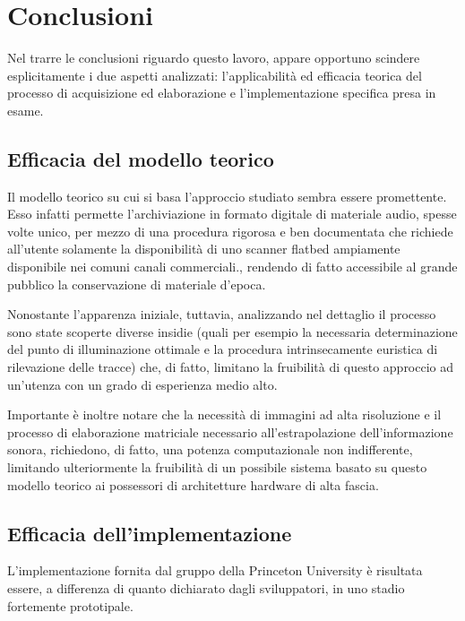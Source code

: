 \section{Conclusioni}
Nel trarre le conclusioni riguardo questo lavoro, appare opportuno scindere esplicitamente i due aspetti analizzati: l'applicabilit\`a ed efficacia teorica del processo di acquisizione ed elaborazione e l'implementazione specifica presa in esame.
\subsection{Efficacia del modello teorico}
Il modello teorico su cui si basa l'approccio studiato sembra essere promettente. Esso infatti permette l'archiviazione in formato digitale di materiale audio, spesse volte unico, per mezzo di una procedura rigorosa e ben documentata che richiede all'utente solamente la disponibilit\`a di uno scanner flatbed ampiamente disponibile nei comuni canali commerciali., rendendo di fatto accessibile al grande pubblico la conservazione di materiale d'epoca.

Nonostante l'apparenza iniziale, tuttavia, analizzando nel dettaglio il processo sono state scoperte diverse insidie (quali per esempio la necessaria determinazione del punto di illuminazione ottimale e la procedura intrinsecamente euristica di rilevazione delle tracce) che, di fatto, limitano la fruibilit\`a di questo approccio ad un'utenza con un grado di esperienza medio alto. 

Importante \`e inoltre notare che la necessit\`a di immagini ad alta risoluzione e il processo di elaborazione matriciale necessario all'estrapolazione dell'informazione sonora, richiedono, di fatto, una potenza computazionale non indifferente, limitando ulteriormente la fruibilit\`a di un possibile sistema basato su questo modello teorico ai possessori di architetture hardware di alta fascia.

\subsection{Efficacia dell'implementazione}
L'implementazione fornita dal gruppo della Princeton University \`e risultata essere, a differenza di quanto dichiarato dagli sviluppatori, in uno stadio fortemente prototipale.

